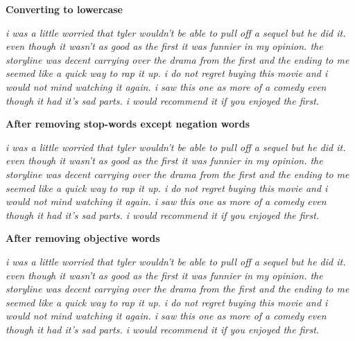 \textbf{Converting to lowercase}

\textit{i was a little worried that tyler wouldn't be able to pull off a sequel but he did it.  even though it wasn't as good as the first it was funnier in my opinion.  
the storyline was decent carrying over the drama from the first and the ending to me seemed like a quick way to rap it up.  i do not regret buying this movie and i would 
not mind watching it again.  i saw this one as more of a comedy even though it had it's sad parts.  i would recommend it if you enjoyed the first.
}

\textbf{After removing stop-words except negation words}

\textit{{\color[rgb]{0.4,0.4,0.4}i was a little} worried {\color[rgb]{0.4,0.4,0.4}that} tyler wouldn't {\color[rgb]{0.4,0.4,0.4}be able to }pull {\color[rgb]{0.4,0.4,0.4}off 
a }sequel {\color[rgb]{0.4,0.4,0.4}but he did it.  even though it} wasn't {\color[rgb]{0.4,0.4,0.4}as} good {\color[rgb]{0.4,0.4,0.4}as the first it was} funnier 
{\color[rgb]{0.4,0.4,0.4}in my} opinion. {\color[rgb]{0.4,0.4,0.4}the} storyline {\color[rgb]{0.4,0.4,0.4}was} decent carrying {\color[rgb]{0.4,0.4,0.4}over the} drama 
{\color[rgb]{0.4,0.4,0.4}from the first and the} ending {\color[rgb]{0.4,0.4,0.4}to me seemed like a} quick {\color[rgb]{0.4,0.4,0.4}way to rap it up. i do} not regret 
buying {\color[rgb]{0.4,0.4,0.4}this} movie {\color[rgb]{0.4,0.4,0.4}and i would} not mind watching {\color[rgb]{0.4,0.4,0.4}it again. i saw this one as more of a }comedy 
{\color[rgb]{0.4,0.4,0.4}even though it had it's} sad parts. {\color[rgb]{0.4,0.4,0.4}i would} recommend {\color[rgb]{0.4,0.4,0.4}it if you} enjoyed {\color[rgb]{0.4,0.4,0.4}the
first.}}

\textbf{After removing objective words}

\textit{{\color[rgb]{0.4,0.4,0.4}i was a little} worried {\color[rgb]{0.4,0.4,0.4}that tyler} wouldn't {\color[rgb]{0.4,0.4,0.4}be able to pull off a sequel but he did it. 
even though it} wasn't {\color[rgb]{0.4,0.4,0.4}as} good {\color[rgb]{0.4,0.4,0.4}as the first it was} funnier {\color[rgb]{0.4,0.4,0.4}in my opinion. the storyline was} 
decent {\color[rgb]{0.4,0.4,0.4}carrying over the drama from the first and the ending to me seemed like a quick way to rap it up. i do} not regret {\color[rgb]{0.4,0.4,0.4}buying 
this movie and i would} not mind {\color[rgb]{0.4,0.4,0.4}watching it again. i saw this one as more of a comedy even though it had it's} sad {\color[rgb]{0.4,0.4,0.4}parts. 
i would} recommend {\color[rgb]{0.4,0.4,0.4}it if you} enjoyed {\color[rgb]{0.4,0.4,0.4}the first.}}

